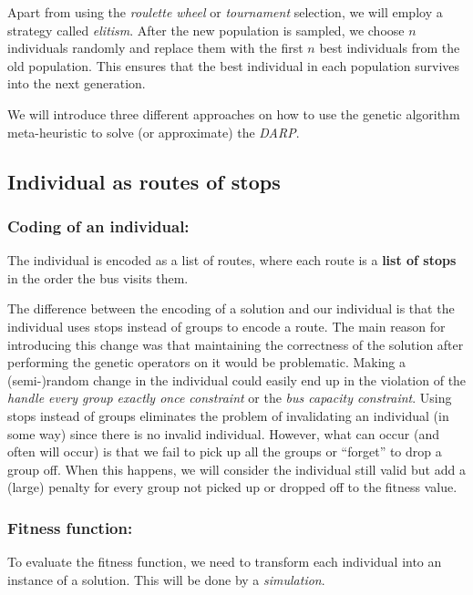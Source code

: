 Apart from using the \textit{roulette wheel} or \textit{tournament} selection, we will employ a strategy called \textit{elitism}. After the new population is sampled, we choose $n$ individuals randomly and replace them with the first $n$ best individuals from the old population. This ensures that the best individual in each population survives into the next generation.

We will introduce three different approaches on how to use the genetic algorithm meta-heuristic to solve (or approximate) the \textit{DARP}. 

\subsection{Individual as routes of stops}

\subsubsection*{Coding of an individual:}

The individual is encoded as a list of routes, where each route is a \textbf{list of stops} in the order the bus visits them.

The difference between the encoding of a solution and our individual is that the individual uses stops instead of groups to encode a route. The main reason for introducing this change was that maintaining the correctness of the solution after performing the genetic operators on it would be problematic. Making a (semi-)random change in the individual could easily end up in the violation of the \textit{handle every group exactly once constraint} or the \textit{bus capacity constraint}. Using stops instead of groups eliminates the problem of invalidating an individual (in some way) since there is no invalid individual. However, what can occur (and often will occur) is that we fail to pick up all the groups or ``forget'' to drop a group off. When this happens, we will consider the individual still valid but add a (large) penalty for every group not picked up or dropped off to the fitness value.

\subsubsection*{Fitness function:}

To evaluate the fitness function, we need to transform each individual into an instance of a solution. This will be done by a \textit{simulation}.

